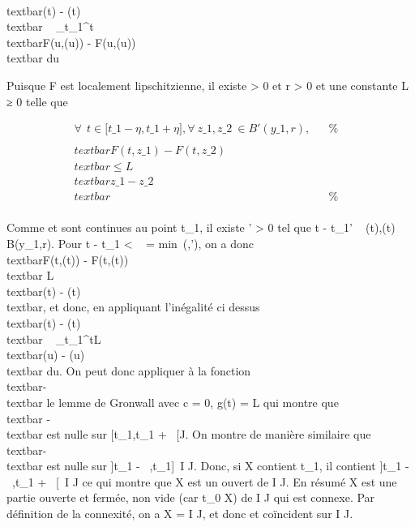 \documentclass[]{article}
\begin{document}
\\textbar{}\phi(t) - \psi(t)\\textbar{}
\leq\int ~
\_t\_1^t\\textbar{}F(u,\phi(u)) -
F(u,\psi(u))\\textbar{} du

Puisque F est localement lipschitzienne, il existe \eta \textgreater{} 0 et
r \textgreater{} 0 et une constante L ≥ 0 telle que

\begin{align*} \forall~~t \in
{[}t\_1 - \eta,t\_1 + \eta{]},
\forall~z\_1,z\_2~ \in
B'(y\_1,r),& & \%& \\
\\textbar{}F(t,z\_1) -
F(t,z\_2)\\textbar{} \leq
L\\textbar{}z\_1 -
z\_2\\textbar{}& & \%&
\\ \end{align*}

Comme \phi et \psi sont continues au point t\_1, il existe \eta'
\textgreater{} 0 tel que \textbar{}t - t\_1\textbar{}\leq \eta' \rigtharrow~
\phi(t),\psi(t) \in B(y\_1,r). Pour \textbar{}t - t\_1\textbar{}
\textless{} \alpha~ = min~(\eta,\eta'), on a donc
\\textbar{}F(t,\phi(t)) -
F(t,\psi(t))\\textbar{} \leq L\\textbar{}\phi(t) -
\psi(t)\\textbar{}, et donc, en appliquant l'inégalité ci
dessus \\textbar{}\phi(t) - \psi(t)\\textbar{}
\leq\int ~
\_t\_1^tL\\textbar{}\phi(u) -
\psi(u)\\textbar{} du. On peut donc appliquer à la fonction
\\textbar{}\phi - \psi\\textbar{} le lemme de
Gronwall avec c = 0, g(t) = L qui montre que \\textbar{}\phi
- \psi\\textbar{} est nulle sur {[}t\_1,t\_1
+ \alpha~{[}\bigcapI \bigcap J. On montre de manière similaire que
\\textbar{}\phi - \psi\\textbar{} est nulle sur
{]}t\_1 - \alpha~,t\_1{]}\, \bigcap I \bigcap J. Donc, si X
contient t\_1, il contient {]}t\_1 - \alpha~,t\_1 +
\alpha~{[}\, \bigcap I \bigcap J ce qui montre que X est un ouvert de I \bigcap
J. En résumé X est une partie ouverte et fermée, non vide (car
t\_0 \in X) de I \bigcap J qui est connexe. Par définition de la
connexité, on a X = I \bigcap J, et donc \phi et \psi coïncident sur I \bigcap J.
\end{document}
